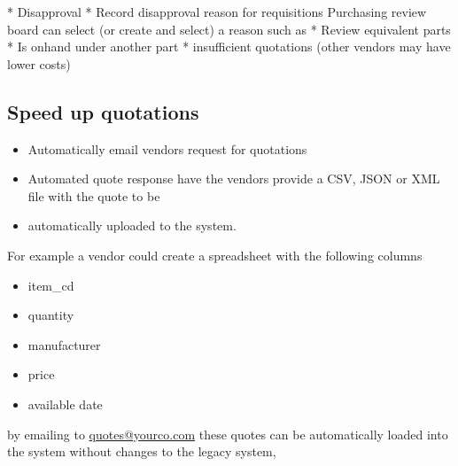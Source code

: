 \documentclass[letterpaper,10pt,english]{sphinxmanual}
\begin{document}
* Disapproval
\textbar{}  * Record disapproval reason for requisitions Purchasing review board
can select (or create and select) a reason such as
\textbar{}  * Review equivalent parts * Is onhand under another part *
insufficient quotations (other vendors may have lower costs)


\subsection{Speed up quotations}
\label{BusinessProcessReengineering:id9}\begin{itemize}
\item {} 
Automatically email vendors request for quotations

\item {} 
Automated quote response have the vendors provide a CSV, JSON or XML
file with the quote to be

\item {} 
automatically uploaded to the system.

\end{itemize}

For example a vendor could create a spreadsheet with the following
columns
\begin{itemize}
\item {} 
item\_cd

\item {} 
quantity

\item {} 
manufacturer

\item {} 
price

\item {} 
available date

\end{itemize}

by emailing to \href{mailto:quotes@yourco.com}{quotes@yourco.com} these quotes can be automatically
loaded into the system without changes to the legacy system,
\end{document}
